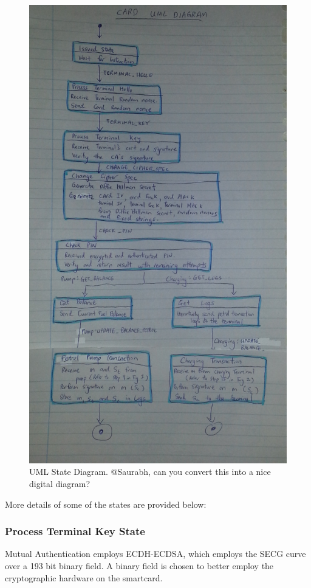 \documentclass[a4paper,10pt]{llncs}
\begin{document}
    \begin{figure}
      \centering
      \includegraphics[scale=0.38]{img/state.jpg}
      \caption{\label{figure:state}UML State Diagram. @Saurabh, can you convert this into a nice digital diagram?}
    \end{figure}



More details of some of the states are provided below:
\subsubsection{Process Terminal Key State}
Mutual Authentication employs ECDH-ECDSA, which employs the SECG curve over a 193 bit binary field. A binary field is chosen to better employ the cryptographic hardware on the smartcard.
\end{document}
